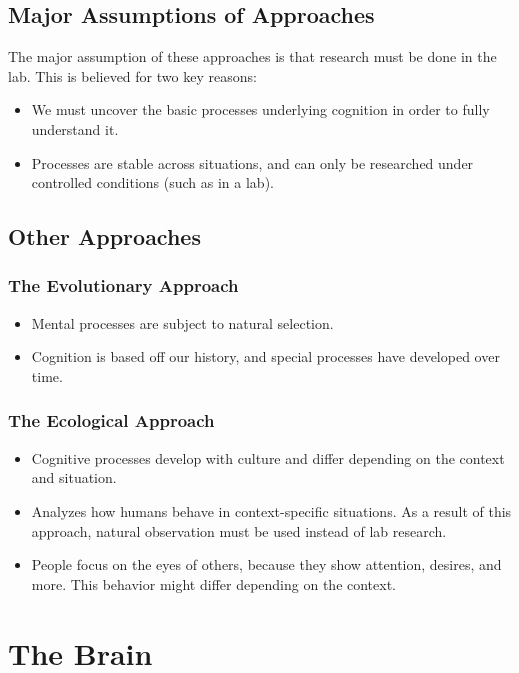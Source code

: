 \documentclass[]{article}
\newcommand{\lecture}[1]{\marginpar{{\footnotesize $\leftarrow$ \underline{#1}}}}
\begin{document}
		\subsection{Major Assumptions of Approaches}
			The major assumption of these approaches is that research must be done in the lab. This is believed for two key reasons:
			\begin{itemize}
				\item We must uncover the basic processes underlying cognition in order to fully understand it.
				\item Processes are stable across situations, and can only be researched under controlled conditions (such as in a lab).
			\end{itemize}
		
		\subsection{Other Approaches}
			\subsubsection{The Evolutionary Approach}
				\begin{itemize}
					\item Mental processes are subject to natural selection.
					\item Cognition is based off our history, and special processes have developed over time.
				\end{itemize}
				
			\subsubsection{The Ecological Approach}
				\begin{itemize}
					\item Cognitive processes develop with culture and differ depending on the context and situation.
					\item Analyzes how humans behave in context-specific situations. As a result of this approach, natural observation must be used instead of lab research.
					\item People focus on the eyes of others, because they show attention, desires, and more. This behavior might differ depending on the context.
				\end{itemize}
	\section{The Brain} \lecture{January 15, 2013}
\end{document}

